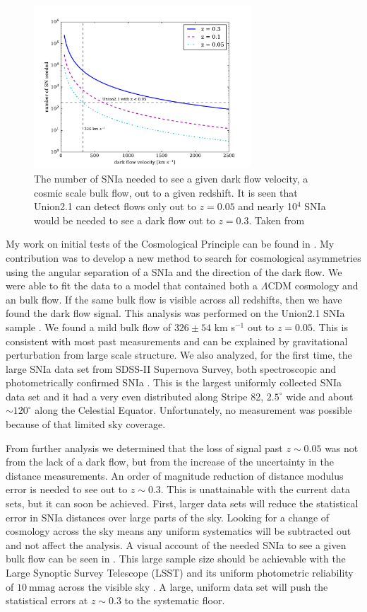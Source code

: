 \documentclass[apj, iop]{emulateapj}
\newcommand{\sn}{SNIa}
\newcommand{\lcdm}{$\Lambda$CDM}     %
\begin{document}
\begin{figure}
	\includegraphics[width=3.2in]{what_dataset_size_v_velocity-2.pdf} 
    \caption{The number of \sn{} needed to see a given dark flow velocity, a
	cosmic scale bulk flow, out to a given redshift. It is seen that Union2.1 
	can detect flows only out to $z=0.05$ and nearly 10$^4$ \sn{} would be 
	needed to see a dark flow out to $z=0.3$. Taken from \cite{Mathews16}}
	\label{f:sn-needed} 
\end{figure}

My work on initial tests of the Cosmological Principle can be found in
\cite{Mathews16}. My contribution was to develop a new method to search for
cosmological asymmetries using the angular separation of a \sn{} and the
direction of the dark flow. We were able to fit the data to a model that
contained both a \lcdm{} cosmology and an bulk flow. If the same bulk flow is
visible across all redshifts, then we have found the dark flow signal. This
analysis was performed on the Union2.1 \sn{} sample \citep{Suzuki12}. We found a
mild bulk flow of $326 \pm 54$ km s$^{-1}$ out to $z = 0.05$. This is consistent
with most past measurements and can be explained by gravitational perturbation
from large scale structure. We also analyzed, for the first time, the large
\sn{} data set from SDSS-II Supernova Survey, both spectroscopic and
photometrically confirmed \sn{} \citep{Campbell13}. This is the largest uniformly
collected \sn{} data set and it had a very even distributed along Stripe
82, $2.5^{\circ}$ wide and about $\sim120^{\circ}$ along the Celestial
Equator. Unfortunately, no measurement was possible because of that limited sky
coverage.

From further analysis we determined that the loss of signal past $z \sim 0.05$
was not from the lack of a dark flow, but from the increase of the uncertainty
in the distance measurements. An order of magnitude reduction of distance
modulus error is needed to see out to $z \sim 0.3$.  This is unattainable with
the current data sets, but it can soon be achieved. First, larger data sets will
reduce the statistical error in \sn{} distances over large parts of the sky.
Looking for a change of cosmology across the sky means any uniform systematics
will be subtracted out and not affect the analysis.  A visual account of the
needed \sn{} to see a given bulk flow can be seen in . This
large sample size should be achievable with the Large Synoptic Survey Telescope
(LSST) and its uniform photometric reliability of $10 ~\text{mmag}$ across the
visible sky \citep{Ivezic08}. A large, uniform data set will push the
statistical errors at $z\sim 0.3$ to the systematic floor.
\end{document}
